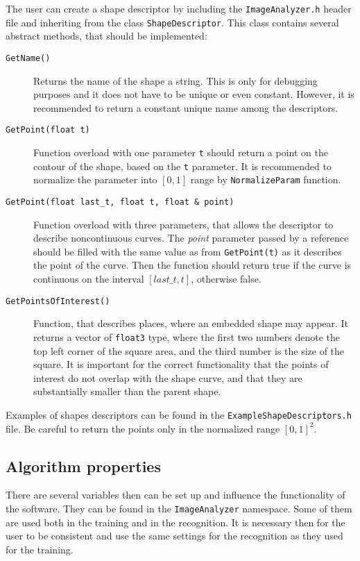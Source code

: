 The user can create a shape descriptor by including the \texttt{ImageAnalyzer.h} header file and inheriting from the class \texttt{ShapeDescriptor}. This class contains several abstract methods, that should be implemented:
\begin{description}
\item[\texttt{GetName()}] Returns the name of the shape a string. This is only for debugging purposes and it does not have to be unique or even constant. However, it is recommended to return a constant unique name among the descriptors.

\item[\texttt{GetPoint(\texttt{float} t)}] Function overload with one parameter \texttt{t} should return a point on the contour of the shape, based on the \texttt{t} parameter. It is recommended to normalize the parameter into $[0,1]$ range by \texttt{NormalizeParam} function.

\item[\texttt{GetPoint(float last\_t, float t, float \& point)}] Function overload with three parameters, that allows the descriptor to describe noncontinuous curves. The \emph{point} parameter passed by a reference should be filled with the same value as from \texttt{GetPoint(t)} as it describes the point of the curve. Then the function should return true if the curve is continuous on the interval $[last\_t, t]$, otherwise false.

\item[\texttt{GetPointsOfInterest()}] Function, that describes places, where an embedded shape may appear. It returns a vector of \texttt{float3} type, where the first two numbers denote the top left corner of the square area, and the third number is the size of the square. It is important for the correct functionality that the points of interest do not overlap with the shape curve, and that they are substantially smaller than the parent shape.
\end{description}

Examples of shapes descriptors can be found in the \texttt{ExampleShapeDescriptors.h} file. Be careful to return the points only in the normalized range $[0,1]^2$.

\subsection{Algorithm properties}
There are several variables then can be set up and influence the functionality of the software. They can be found in the \texttt{ImageAnalyzer} namespace. Some of them are used both in the training and in the recognition. It is necessary then for the user to be consistent and use the same settings for the recognition as they used for the training.


